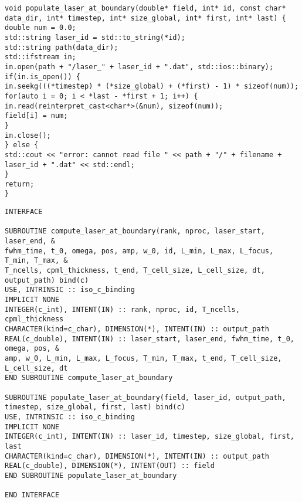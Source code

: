 \begin{lstlisting}[style=CXX, caption=Extern C++ function to fill Fortran arrays with laser fields dumped in binary file]
void populate_laser_at_boundary(double* field, int* id, const char* data_dir, int* timestep, int* size_global, int* first, int* last) {
double num = 0.0;
std::string laser_id = std::to_string(*id);
std::string path(data_dir);
std::ifstream in;
in.open(path + "/laser_" + laser_id + ".dat", std::ios::binary);
if(in.is_open()) {
in.seekg(((*timestep) * (*size_global) + (*first) - 1) * sizeof(num));
for(auto i = 0; i < *last - *first + 1; i++) {
in.read(reinterpret_cast<char*>(&num), sizeof(num));
field[i] = num;
}
in.close();
} else {
std::cout << "error: cannot read file " << path + "/" + filename + laser_id + ".dat" << std::endl;
}
return;
}
\end{lstlisting}

\begin{lstlisting}[style=FORTRAN, caption=Fortran interfaces for C++ library functions]
INTERFACE

SUBROUTINE compute_laser_at_boundary(rank, nproc, laser_start, laser_end, &
fwhm_time, t_0, omega, pos, amp, w_0, id, L_min, L_max, L_focus, T_min, T_max, &
T_ncells, cpml_thickness, t_end, T_cell_size, L_cell_size, dt, output_path) bind(c)
USE, INTRINSIC :: iso_c_binding
IMPLICIT NONE
INTEGER(c_int), INTENT(IN) :: rank, nproc, id, T_ncells, cpml_thickness
CHARACTER(kind=c_char), DIMENSION(*), INTENT(IN) :: output_path
REAL(c_double), INTENT(IN) :: laser_start, laser_end, fwhm_time, t_0, omega, pos, &
amp, w_0, L_min, L_max, L_focus, T_min, T_max, t_end, T_cell_size, L_cell_size, dt
END SUBROUTINE compute_laser_at_boundary

SUBROUTINE populate_laser_at_boundary(field, laser_id, output_path, timestep, size_global, first, last) bind(c)
USE, INTRINSIC :: iso_c_binding
IMPLICIT NONE
INTEGER(c_int), INTENT(IN) :: laser_id, timestep, size_global, first, last
CHARACTER(kind=c_char), DIMENSION(*), INTENT(IN) :: output_path
REAL(c_double), DIMENSION(*), INTENT(OUT) :: field
END SUBROUTINE populate_laser_at_boundary

END INTERFACE
\end{lstlisting}

